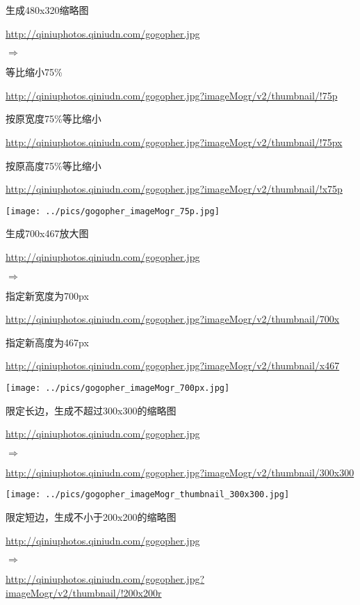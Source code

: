 \documentclass[11pt, oneside]{book}
\newcommand{\qpar}[1]{
\vspace{0.25em}
\noindent
#1\par
\vspace{0.25em}
}
\newcommand{\qurl}[1]{\footnotesize\url{#1}\normalsize}
\begin{document}
\begin{CJK*}{UTF8}{song}
\begin{sample}
  \caption{生成480x320缩略图}
    \qpar{\qurl{http://qiniuphotos.qiniudn.com/gogopher.jpg}}
    \qpar{$\Rightarrow$}
    \qpar{等比缩小75\%}
    \qpar{\qurl{http://qiniuphotos.qiniudn.com/gogopher.jpg?imageMogr/v2/thumbnail/!75p}}
    \qpar{按原宽度75\%等比缩小}
    \qpar{\qurl{http://qiniuphotos.qiniudn.com/gogopher.jpg?imageMogr/v2/thumbnail/!75px}}
    \qpar{按原高度75\%等比缩小}
    \qpar{\qurl{http://qiniuphotos.qiniudn.com/gogopher.jpg?imageMogr/v2/thumbnail/!x75p}}

    \begin{center}
      \texttt{[image: ../pics/gogopher\_imageMogr\_75p.jpg]}
    \end{center}
  \label{imageMogr-thumbnail-75p}
\end{sample}

\begin{sample}
  \caption{生成700x467放大图}
    \qpar{\qurl{http://qiniuphotos.qiniudn.com/gogopher.jpg}}
    \qpar{$\Rightarrow$}
    \qpar{指定新宽度为700px}
    \qpar{\qurl{http://qiniuphotos.qiniudn.com/gogopher.jpg?imageMogr/v2/thumbnail/700x}}
    \qpar{指定新高度为467px}
    \qpar{\qurl{http://qiniuphotos.qiniudn.com/gogopher.jpg?imageMogr/v2/thumbnail/x467}}

    \begin{center}
      \texttt{[image: ../pics/gogopher\_imageMogr\_700px.jpg]}
    \end{center}
  \label{imageMogr-thumbnail-700px}
\end{sample}

\begin{sample}
  \caption{限定长边，生成不超过300x300的缩略图}
    \qpar{\qurl{http://qiniuphotos.qiniudn.com/gogopher.jpg}}
    \qpar{$\Rightarrow$}
    \qpar{\qurl{http://qiniuphotos.qiniudn.com/gogopher.jpg?imageMogr/v2/thumbnail/300x300}}

    \begin{center}
      \texttt{[image: ../pics/gogopher\_imageMogr\_thumbnail\_300x300.jpg]}
    \end{center}
  \label{imageMogr-thumbnail-300x300}
\end{sample}

\begin{sample}
  \caption{限定短边，生成不小于200x200的缩略图}
    \qpar{\qurl{http://qiniuphotos.qiniudn.com/gogopher.jpg}}
    \qpar{$\Rightarrow$}
    \qpar{\qurl{http://qiniuphotos.qiniudn.com/gogopher.jpg?imageMogr/v2/thumbnail/!200x200r}}


\end{sample}
\end{CJK*}
\end{document}
